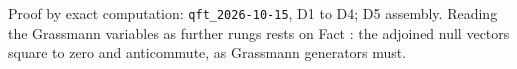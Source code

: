 Proof by exact computation: \texttt{qft\_2026-10-15}, D1 to D4; D5 assembly. Reading the Grassmann variables as further rungs rests on Fact : the adjoined null vectors square to zero and anticommute, as Grassmann generators must.
